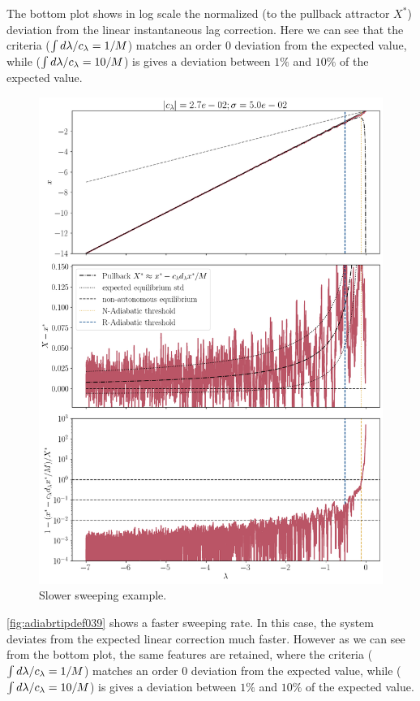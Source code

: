 The bottom plot shows in log scale the normalized (to the pullback attractor $X^*$) deviation from the linear instantaneous lag correction. 
Here we can see that the criteria ($\int d\lambda/c_\lambda =1/M$) matches an order 0 deviation from the expected value, while ($\int d\lambda/c_\lambda =10/M$) is gives a deviation between $1\%$ and $10\%$ of the expected value. 


\begin{figure}[htb]
	\centering
	\includegraphics[width=0.9\linewidth]{Images/Metrics/traking/adiab_rtip_def010}
	\caption{Slower sweeping example.  }
	\label{fig:adiabrtipdef010}
\end{figure}

\cref{fig:adiabrtipdef039} shows a faster sweeping rate. In this case, the system deviates from the expected linear correction much faster. However as we can see from the bottom plot, the same features are retained, where the criteria ($\int d\lambda/c_\lambda =1/M$) matches an order 0 deviation from the expected value, while ($\int d\lambda/c_\lambda =10/M$) is gives a deviation between $1\%$ and $10\%$ of the expected value. 

